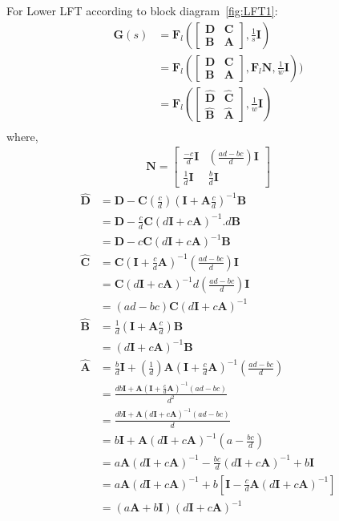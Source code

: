 \documentclass{scrreprt}
\begin{document}
For Lower LFT according to block diagram~\ref{fig:LFT1}:
\begin{align*}
\bm{G}(s)&=\bm{F}_l(
\begin{bmatrix}
\bm{D} & \bm{C}\\
\bm{B} & \bm{A}
\end{bmatrix}, \frac{1}{s}\bm{I})\\
&= \bm{F}_l(
\begin{bmatrix}
\bm{D} & \bm{C}\\
\bm{B} & \bm{A}
\end{bmatrix}, \bm{F}_l\bm{N},\frac{1}{w}\bm{I}))\\
&=\bm{F}_l(
\begin{bmatrix}
\hat{\bm{D}} & \hat{\bm{C}}\\
\hat{\bm{B}} & \hat{\bm{A}}
\end{bmatrix}, \frac{1}{w}\bm{I})\\
\end{align*}
where,
\begin{align*}
\bm{N}=
\begin{bmatrix}
 \frac{-c}{d}\bm{I} & (\frac{ad-bc}{d})\bm{I}\\
\frac{1}{d}\bm{I} & \frac{b}{d}\bm{I}
\end{bmatrix}
\end{align*}
\begin{align*}
\hat{\bm{D}} &= \bm{D}-\bm{C}(\frac{c}{d})(\bm{I}+\bm{A}\frac{c}{d})^{-1}\bm{B}\\
	&= \bm{D}-\frac{c}{d}\bm{C}(d\bm{I}+c\bm{A})^{-1}.d\bm{B}\\
	&= \bm{D}-c\bm{C}(d\bm{I}+c\bm{A})^{-1}\bm{B}\\
\hat{\bm{C}} &= \bm{C}(\bm{I}+\frac{c}{d}\bm{A})^{-1}(\frac{ad-bc}{d})\bm{I}\\
	&= \bm{C}(d\bm{I}+c\bm{A})^{-1}d(\frac{ad-bc}{d})\bm{I}\\
	&= (ad-bc)\bm{C}(d\bm{I}+c\bm{A})^{-1}\\
\hat{\bm{B}} &= \frac{1}{d}(\bm{I}+\bm{A}\frac{c}{d})\bm{B}\\
	&= (d\bm{I}+c\bm{A})^{-1}\bm{B}\\
\hat{\bm{A}} &= \frac{b}{d}\bm{I}+(\frac{1}{d})\bm{A}(\bm{I}+\frac{c}{d}\bm{A})^{-1}(\frac{ad-bc}{d})\\
	&=\frac{db\bm{I}+\bm{A}(\bm{I}+\frac{c}{d}\bm{A})^{-1}(ad-bc)}{d^2}\\
	&=\frac{db\bm{I}+\bm{A}(d\bm{I}+c\bm{A})^{-1}(ad-bc)}{d}\\
	&= b\bm{I}+\bm{A}(d\bm{I}+c\bm{A})^{-1}(a-\frac{bc}{d})\\
	&= a\bm{A}(d\bm{I}+c\bm{A})^{-1}-\frac{bc}{d}(d\bm{I}+c\bm{A})^{-1} + b\bm{I}\\
	&= a\bm{A}(d\bm{I}+c\bm{A})^{-1}+b[\bm{I}-\frac{c}{d}\bm{A}(d\bm{I}+c\bm{A})^{-1}]\\
	&= (a\bm{A}+b\bm{I})(d\bm{I}+c\bm{A})^{-1}
\end{align*}
\end{document}
